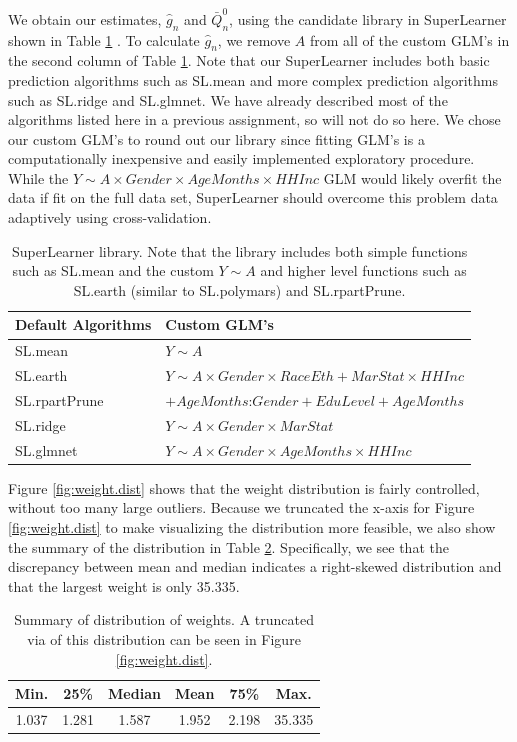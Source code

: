 \documentclass{article}
\begin{document}
We obtain our estimates, $\hat{g}_{n}$ and $\bar{Q}_{n}^0$, using the candidate library in SuperLearner shown in Table \ref{tab:sl.lib} \cite{superlearner}. To calculate $\hat{g}_{n}$, we remove $A$ from all of the custom GLM's in the second column of Table \ref{tab:sl.lib}. Note that our SuperLearner includes both basic prediction algorithms such as SL.mean and more complex prediction algorithms such as SL.ridge and SL.glmnet. We have already described most of the algorithms listed here in a previous assignment, so will not do so here. We chose our custom GLM's to round out our library since fitting GLM's is a computationally inexpensive and easily implemented exploratory procedure. While the $Y \sim A \times Gender \times AgeMonths \times HHInc$ GLM would likely overfit the data if fit on the full data set, SuperLearner should overcome this problem data adaptively using cross-validation.

\begin{table}[tbp]
\centering
\begin{tabular}{l | l}
Default Algorithms & Custom GLM's \\
\hline
SL.mean & $Y \sim A$ \\
SL.earth & $Y \sim A \times Gender \times RaceEth + MarStat \times HHInc$ \\
SL.rpartPrune & $+ AgeMonths$:$Gender + EduLevel + AgeMonths $ \\
SL.ridge & $Y \sim A \times Gender \times MarStat$ \\
SL.glmnet &  $Y \sim A \times Gender \times AgeMonths \times HHInc$ \\
\end{tabular}
\caption{SuperLearner library. Note that the library includes both simple functions such as SL.mean and the custom $Y\sim A$ and higher level functions such as SL.earth (similar to SL.polymars) and SL.rpartPrune.}
\label{tab:sl.lib}
\end{table}

Figure \ref{fig:weight.dist}  shows that the weight distribution is fairly controlled, without too many large outliers. Because we truncated the x-axis for Figure \ref{fig:weight.dist} to make visualizing the distribution more feasible, we also show the summary of the distribution in Table \ref{tab:weight.summary}. Specifically, we see that the discrepancy between mean and median indicates a right-skewed distribution and that the largest weight is only 35.335.

\begin{table}[tbp]
\centering
\begin{tabular}{cccccc}
  \hline
 Min. & 25\% & Median & Mean & 75\% & Max. \\ 
  \hline
 1.037   & 1.281   & 1.587   & 1.952   &  2.198   &  35.335   \\ 
   \hline
\end{tabular}
\caption{Summary of distribution of weights. A truncated via of this distribution can be seen in Figure \ref{fig:weight.dist}.}
\label{tab:weight.summary}
\end{table}
\end{document}
